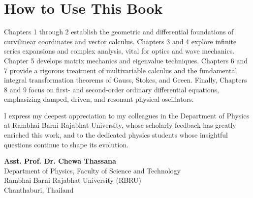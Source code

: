 \section*{How to Use This Book}

Chapters 1 through 2 establish the geometric and differential foundations of curvilinear coordinates and vector calculus. Chapters 3 and 4 explore infinite series expansions and complex analysis, vital for optics and wave mechanics. Chapter 5 develops matrix mechanics and eigenvalue techniques. Chapters 6 and 7 provide a rigorous treatment of multivariable calculus and the fundamental integral transformation theorems of Gauss, Stokes, and Green. Finally, Chapters 8 and 9 focus on first- and second-order ordinary differential equations, emphasizing damped, driven, and resonant physical oscillators.

I express my deepest appreciation to my colleagues in the Department of Physics at Rambhai Barni Rajabhat University, whose scholarly feedback has greatly enriched this work, and to the dedicated physics students whose insightful questions continue to shape its evolution.

\vspace{1.5cm}
\begin{flushright}
    \textbf{Asst. Prof. Dr. Chewa Thassana}\\
    Department of Physics, Faculty of Science and Technology\\
    Rambhai Barni Rajabhat University (RBRU)\\
    Chanthaburi, Thailand
\end{flushright}
